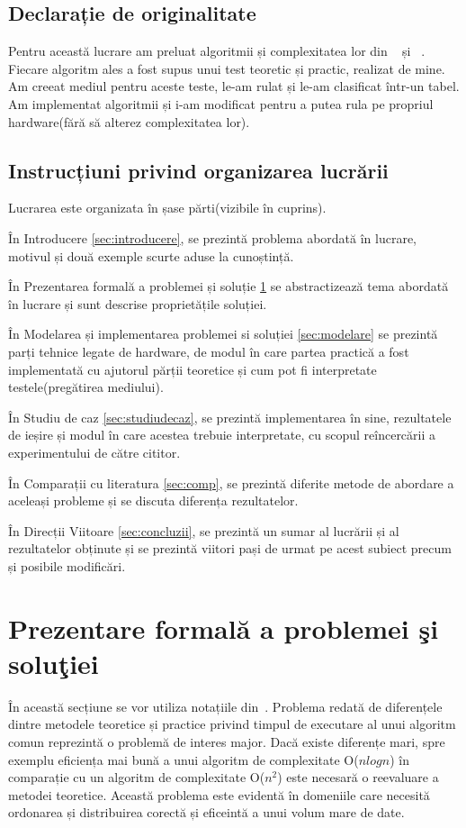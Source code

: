 \documentclass[12pt]{article}
\begin{document}
\subsection{Declarație de originalitate}
Pentru această lucrare am preluat algoritmii și complexitatea lor din ~\cite{SKIENA2008} și ~\cite{ZAHARIE2008}. Fiecare algoritm ales a fost supus unui test teoretic și practic, realizat de mine. Am creeat mediul pentru aceste teste, le-am rulat și le-am clasificat într-un tabel. Am implementat algoritmii și i-am modificat pentru a putea rula pe propriul hardware(fără să alterez complexitatea lor).
\subsection{Instrucțiuni privind organizarea lucrării}
Lucrarea este organizata în șase părti(vizibile în cuprins).

În Introducere \ref{sec:introducere}, se prezintă problema abordată în lucrare, motivul și două exemple scurte aduse la cunoștință.

În Prezentarea formală a problemei și soluție \ref{sec:formala} se abstractizează tema abordată în lucrare și sunt descrise proprietățile soluției.

În Modelarea și implementarea problemei si soluției \ref{sec:modelare} se prezintă parți tehnice legate de hardware, de modul în care partea practică a fost implementată cu ajutorul părții teoretice și cum pot fi interpretate testele(pregătirea mediului).

În Studiu de caz \ref{sec:studiudecaz}, se prezintă implementarea în sine, rezultatele de ieșire și modul în care acestea trebuie interpretate, cu scopul reîncercării a experimentului de către cititor.

În Comparații cu literatura \ref{sec:comp}, se prezintă diferite metode de abordare a aceleași probleme și se discuta diferența rezultatelor.

În Direcții Viitoare \ref{sec:concluzii}, se prezintă un sumar al lucrării și al rezultatelor obținute și se prezintă viitori pași de urmat pe acest subiect precum și posibile modificări.


\section{Prezentare formală a problemei şi soluţiei}
\label{sec:formala}

În această secțiune se vor utiliza notațiile din~\cite{SKIENA2008}. 
Problema redată de diferențele dintre metodele teoretice și practice privind timpul de executare al unui algoritm comun reprezintă o problemă de interes major. Dacă existe diferențe mari, spre exemplu eficiența mai bună a unui algoritm de complexitate O($nlog n$) în comparație cu un algoritm de complexitate O($n^2$) este necesară o reevaluare a metodei teoretice. Această problema este evidentă în domeniile care necesită ordonarea și distribuirea corectă și eficeintă a unui volum mare de date. 
\end{document}
